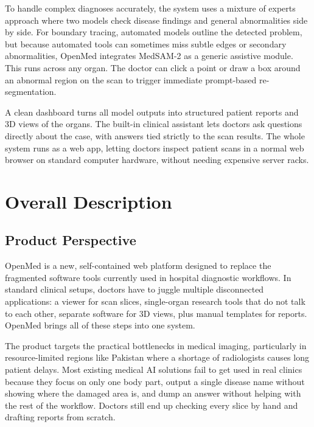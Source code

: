 \documentclass[12pt,a4paper]{report}
\begin{document}
To handle complex diagnoses accurately, the system uses a mixture of experts approach where two models check disease findings and general abnormalities side by side. For boundary tracing, automated models outline the detected problem, but because automated tools can sometimes miss subtle edges or secondary abnormalities, OpenMed integrates MedSAM-2 as a generic assistive module. This runs across any organ. The doctor can click a point or draw a box around an abnormal region on the scan to trigger immediate prompt-based re-segmentation.

A clean dashboard turns all model outputs into structured patient reports and 3D views of the organs. The built-in clinical assistant lets doctors ask questions directly about the case, with answers tied strictly to the scan results. The whole system runs as a web app, letting doctors inspect patient scans in a normal web browser on standard computer hardware, without needing expensive server racks.

\section{Overall Description}

\subsection{Product Perspective}
OpenMed is a new, self-contained web platform designed to replace the fragmented software tools currently used in hospital diagnostic workflows. In standard clinical setups, doctors have to juggle multiple disconnected applications: a viewer for scan slices, single-organ research tools that do not talk to each other, separate software for 3D views, plus manual templates for reports. OpenMed brings all of these steps into one system.

The product targets the practical bottlenecks in medical imaging, particularly in resource-limited regions like Pakistan where a shortage of radiologists causes long patient delays. Most existing medical AI solutions fail to get used in real clinics because they focus on only one body part, output a single disease name without showing where the damaged area is, and dump an answer without helping with the rest of the workflow. Doctors still end up checking every slice by hand and drafting reports from scratch.
\end{document}
